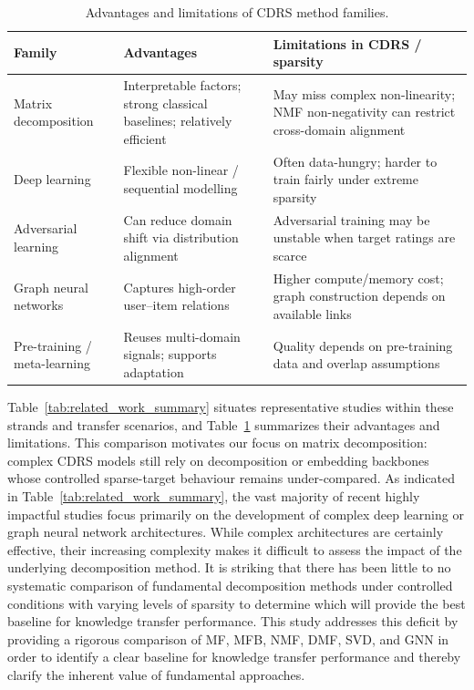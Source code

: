 \documentclass[pdflatex,sn-mathphys-num]{sn-jnl}%
\theoremstyle{thmstyleone}%
\theoremstyle{thmstyletwo}%
\theoremstyle{thmstylethree}%
\begin{document}
\begin{table}[!htbp]
\centering
\caption{Advantages and limitations of CDRS method families.}
\label{tab:family_pros_cons}
\renewcommand{\arraystretch}{1.15}
\scriptsize
\setlength{\tabcolsep}{4pt}
\begin{tabular}{p{2.4cm} p{5.0cm} p{5.2cm}}
\toprule
\textbf{Family} & \textbf{Advantages} & \textbf{Limitations in CDRS / sparsity} \\
\midrule
Matrix decomposition & Interpretable factors; strong classical baselines; relatively efficient & May miss complex non-linearity; NMF non-negativity can restrict cross-domain alignment \\
Deep learning & Flexible non-linear / sequential modelling & Often data-hungry; harder to train fairly under extreme sparsity \\
Adversarial learning & Can reduce domain shift via distribution alignment & Adversarial training may be unstable when target ratings are scarce \\
Graph neural networks & Captures high-order user--item relations & Higher compute/memory cost; graph construction depends on available links \\
Pre-training / meta-learning & Reuses multi-domain signals; supports adaptation & Quality depends on pre-training data and overlap assumptions \\
\bottomrule
\end{tabular}
\end{table}

Table~\ref{tab:related_work_summary} situates representative studies within these strands and transfer scenarios, and Table~\ref{tab:family_pros_cons} summarizes their advantages and limitations. This comparison motivates our focus on matrix decomposition: complex CDRS models still rely on decomposition or embedding backbones whose controlled sparse-target behaviour remains under-compared. As indicated in Table~\ref{tab:related_work_summary}, the vast majority of recent highly impactful studies focus primarily on the development of complex deep learning or graph neural network architectures. While complex architectures are certainly effective, their increasing complexity makes it difficult to assess the impact of the underlying decomposition method. It is striking that there has been little to no systematic comparison of fundamental decomposition methods under controlled conditions with varying levels of sparsity to determine which will provide the best baseline for knowledge transfer performance. This study addresses this deficit by providing a rigorous comparison of MF, MFB, NMF, DMF, SVD, and GNN in order to identify a clear baseline for knowledge transfer performance and thereby clarify the inherent value of fundamental approaches.
\end{document}
